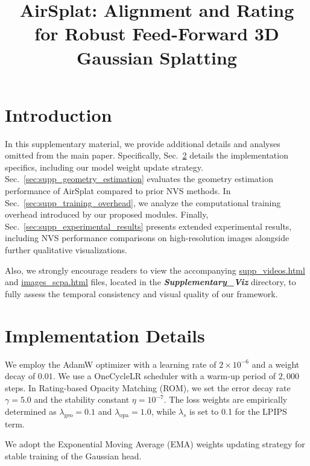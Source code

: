 \documentclass[runningheads]{llncs}
\begin{document}
\title{AirSplat: Alignment and Rating for Robust Feed-Forward 3D Gaussian Splatting}
\maketitle


\section{Introduction}
In this supplementary material, we provide additional details and analyses omitted from the main paper. 
Specifically, Sec.~\ref{sec:supp_implementation_details} details the implementation specifics, including our model weight update strategy. 
Sec.~\ref{sec:supp_geometry_estimation} evaluates the geometry estimation performance of AirSplat compared to prior NVS methods.
In Sec.~\ref{sec:supp_training_overhead}, we analyze the computational training overhead introduced by our proposed modules. 
Finally, Sec.~\ref{sec:supp_experimental_results} presents extended experimental results, including NVS performance comparisons on high-resolution images alongside further qualitative visualizations.

Also, we strongly encourage readers to view the accompanying \href{./Supplementary_Viz/supp_videos.html}{supp\_videos.html} and \href{./Supplementary_Viz/images_scpa.html}{images\_scpa.html} files, located in the \textit{\textbf{Supplementary\_Viz}} directory, to fully assess the temporal consistency and visual quality of our framework.



\section{Implementation Details}
\label{sec:supp_implementation_details}
We employ the AdamW optimizer \cite{loshchilov2017adamw} with a learning rate of $2 \times 10^{-6}$ and a weight decay of $0.01$. 
We use a OneCycleLR \cite{smith2019super} scheduler with a warm-up period of $2,000$ steps. In Rating-based Opacity Matching (ROM), we set the error decay rate $\gamma=5.0$ and the stability constant $\eta=10^{-7}$. 
The loss weights are empirically determined as $\lambda_\text{geo}=0.1$ and $\lambda_\text{opa}=1.0$, while $\lambda_{s}$ is set to 0.1 for the LPIPS term. 

We adopt the Exponential Moving Average (EMA) \cite{tarvainen2017ema} weights updating strategy for stable training of the Gaussian head. 
\end{document}
